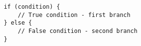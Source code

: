 \begin{lstlisting}
	if (condition) {
		// True condition - first branch
	} else {
		// False condition - second branch
	}
\end{lstlisting}
